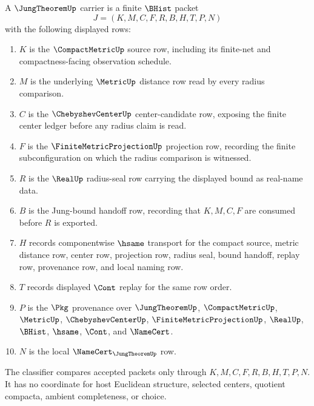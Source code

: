 \begin{definition}
\label{def:jung-theorem-carrier}
A $\JungTheoremUp$ carrier is a finite $\BHist$ packet
$$
J=(K,M,C,F,R,B,H,T,P,N)
$$
with the following displayed rows:
\begin{enumerate}
\item $K$ is the $\CompactMetricUp$ source row, including its finite-net and compactness-facing observation schedule.
\item $M$ is the underlying $\MetricUp$ distance row read by every radius comparison.
\item $C$ is the $\ChebyshevCenterUp$ center-candidate row, exposing the finite center ledger before any radius claim is read.
\item $F$ is the $\FiniteMetricProjectionUp$ projection row, recording the finite subconfiguration on which the radius comparison is witnessed.
\item $R$ is the $\RealUp$ radius-seal row carrying the displayed bound as real-name data.
\item $B$ is the Jung-bound handoff row, recording that $K,M,C,F$ are consumed before $R$ is exported.
\item $H$ records componentwise $\hsame$ transport for the compact source, metric distance row, center row, projection row, radius seal, bound handoff, replay row, provenance row, and local naming row.
\item $T$ records displayed $\Cont$ replay for the same row order.
\item $P$ is the $\Pkg$ provenance over $\JungTheoremUp$, $\CompactMetricUp$, $\MetricUp$, $\ChebyshevCenterUp$, $\FiniteMetricProjectionUp$, $\RealUp$, $\BHist$, $\hsame$, $\Cont$, and $\NameCert$.
\item $N$ is the local $\NameCert_{\JungTheoremUp}$ row.
\end{enumerate}
The classifier compares accepted packets only through $K,M,C,F,R,B,H,T,P,N$. It has no coordinate for host Euclidean structure, selected centers, quotient compacta, ambient completeness, or choice.
\end{definition}

